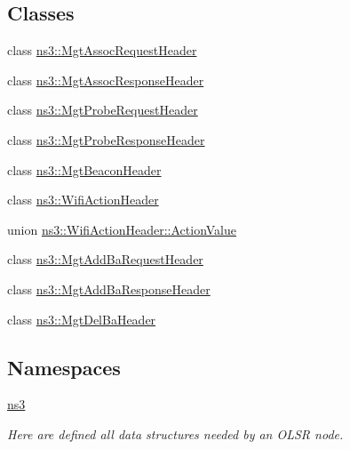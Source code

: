 \subsection*{Classes}
\begin{DoxyCompactItemize}
\item 
class \hyperlink{classns3_1_1MgtAssocRequestHeader}{ns3\+::\+Mgt\+Assoc\+Request\+Header}
\item 
class \hyperlink{classns3_1_1MgtAssocResponseHeader}{ns3\+::\+Mgt\+Assoc\+Response\+Header}
\item 
class \hyperlink{classns3_1_1MgtProbeRequestHeader}{ns3\+::\+Mgt\+Probe\+Request\+Header}
\item 
class \hyperlink{classns3_1_1MgtProbeResponseHeader}{ns3\+::\+Mgt\+Probe\+Response\+Header}
\item 
class \hyperlink{classns3_1_1MgtBeaconHeader}{ns3\+::\+Mgt\+Beacon\+Header}
\item 
class \hyperlink{classns3_1_1WifiActionHeader}{ns3\+::\+Wifi\+Action\+Header}
\item 
union \hyperlink{unionns3_1_1WifiActionHeader_1_1ActionValue}{ns3\+::\+Wifi\+Action\+Header\+::\+Action\+Value}
\item 
class \hyperlink{classns3_1_1MgtAddBaRequestHeader}{ns3\+::\+Mgt\+Add\+Ba\+Request\+Header}
\item 
class \hyperlink{classns3_1_1MgtAddBaResponseHeader}{ns3\+::\+Mgt\+Add\+Ba\+Response\+Header}
\item 
class \hyperlink{classns3_1_1MgtDelBaHeader}{ns3\+::\+Mgt\+Del\+Ba\+Header}
\end{DoxyCompactItemize}
\subsection*{Namespaces}
\begin{DoxyCompactItemize}
\item 
 \hyperlink{namespacens3}{ns3}
\begin{DoxyCompactList}\small\item\em Here are defined all data structures needed by an O\+L\+SR node. \end{DoxyCompactList}\end{DoxyCompactItemize}

